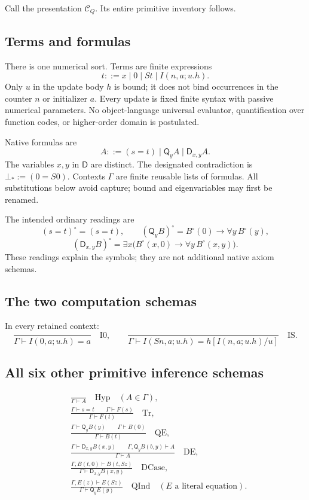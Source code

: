 \documentclass[11pt,letterpaper]{article}
\theoremstyle{definition}\newtheorem{definition}[theorem]{Definition}
\theoremstyle{remark}\newtheorem{remark}[theorem]{Remark}
\newcommand{\CQ}{\mathcal C_Q}
\newcommand{\D}{\mathsf D}
\newcommand{\Q}{\mathsf Q}
\begin{document}
Call the presentation $\CQ$. Its entire primitive inventory follows.

\subsection{Terms and formulas}

There is one numerical sort. Terms are finite expressions
\[
 t::=x\mid0\mid St\mid I(n,a;u.h).
\]
Only $u$ in the update body $h$ is bound; it does not bind occurrences
in the counter $n$ or initializer $a$. Every update is fixed finite
syntax with passive numerical parameters. No object-language universal
evaluator, quantification over function codes, or higher-order domain is
postulated.

Native formulas are
\[
 A::=(s=t)\mid\Q_y A\mid\D_{x,y}A.
\]
The variables $x,y$ in $\D$ are distinct. The designated contradiction is
$\bot_*:=(0=S0)$. Contexts $\Gamma$ are finite reusable lists of formulas.
All substitutions below avoid capture; bound and eigenvariables may
first be renamed.

The intended ordinary readings are
\[
 (s=t)^\circ=(s=t),\qquad
 (\Q_yB)^\circ=B^\circ(0)\to\forall y\,B^\circ(y),
\]
\[
 (\D_{x,y}B)^\circ=
 \exists x\bigl(B^\circ(x,0)\to\forall y\,B^\circ(x,y)\bigr).
\]
These readings explain the symbols; they are not additional native
axiom schemas.

\subsection{The two computation schemas}

In every retained context:
\[
 \frac{}{\Gamma\vdash I(0,a;u.h)=a}\quad\mathrm{I0},
 \qquad
 \frac{}{\Gamma\vdash I(Sn,a;u.h)=h[I(n,a;u.h)/u]}\quad\mathrm{IS}.
\]

\subsection{All six other primitive inference schemas}

\begin{align*}
 &\frac{}{\Gamma\vdash A}\quad\mathrm{Hyp}\quad(A\in\Gamma),\\[5pt]
 &\frac{\Gamma\vdash s=t\qquad\Gamma\vdash F(s)}
        {\Gamma\vdash F(t)}\quad\mathrm{Tr},\\[5pt]
 &\frac{\Gamma\vdash\Q_yB(y)\qquad\Gamma\vdash B(0)}
        {\Gamma\vdash B(t)}\quad\mathrm{QE},\\[5pt]
 &\frac{\Gamma\vdash\D_{x,y}B(x,y)\qquad
         \Gamma,\Q_yB(b,y)\vdash A}
        {\Gamma\vdash A}\quad\mathrm{DE},\\[5pt]
 &\frac{\Gamma,B(t,0)\vdash B(t,Sz)}
        {\Gamma\vdash\D_{x,y}B(x,y)}\quad\mathrm{DCase},\\[5pt]
 &\frac{\Gamma,E(z)\vdash E(Sz)}
        {\Gamma\vdash\Q_yE(y)}\quad\mathrm{QInd}
        \quad(E\text{ a literal equation}).
\end{align*}
\end{document}
